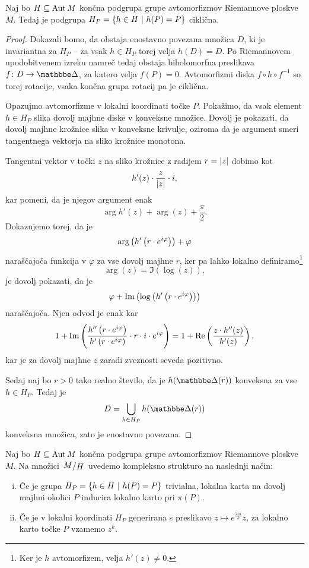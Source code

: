 \begin{trditev}
Naj bo $H \subseteq \operatorname{Aut} M$ končna podgrupa grupe avtomorfizmov
Riemannove ploskve $M$. Tedaj je podgrupa
$H_P = \left\{h \in H~\middle\vert~h(P) = P\right\}$ ciklična.
\end{trditev}

\begin{proof}
Dokazali bomo, da obstaja enostavno povezana množica $D$, ki je
invariantna za $H_P$ -- za vsak $h \in H_P$ torej velja $h(D) = D$.
Po Riemannovem upodobitvenem izreku namreč tedaj obstaja
biholomorfna preslikava $f \colon D \to \dsk$, za katero velja
$f(P) = 0$. Avtomorfizmi diska $f \circ h \circ f^{-1}$ so torej
rotacije, vsaka končna grupa rotacij pa je ciklična.

Opazujmo avtomorfizme v lokalni koordinati točke $P$. Pokažimo, da
vsak element $h \in H_P$ slika dovolj majhne diske v konveksne
množice. Dovolj je pokazati, da dovolj majhne krožnice slika v
konveksne krivulje, oziroma da je argument smeri tangentnega
vektorja na sliko krožnice monotona.

Tangentni vektor v točki $z$ na sliko krožnice z radijem
$r = \left\lvert z\right\rvert$ dobimo kot
\[
h'(z) \cdot \frac{z}{\left\lvert z\right\rvert} \cdot i,
\]
kar pomeni, da je njegov argument enak
\[
\arg{h'(z)} + \arg(z) + \frac{\pi}{2}.
\]
Dokazujemo torej, da je
\[
\arg \left(h' \left(r \cdot e^{i \varphi}\right)\right) + \varphi
\]
naraščajoča funkcija v $\varphi$ za vse dovolj majhne $r$, ker pa
lahko lokalno definiramo\footnote{Ker je $h$ avtomorfizem, velja
$h'(z) \ne 0$.}
\[
\arg(z) = \Im(\log(z)),
\]
je dovolj pokazati, da je
\[
\varphi + \operatorname{Im} \left(\log \left(h' \left(r \cdot e^{i \varphi}\right)\right)\right)
\]
naraščajoča. Njen odvod je enak kar
\[
1 + \operatorname{Im} \left(\frac{h'' \left(r \cdot e^{i \varphi}\right)}
{h' \left(r \cdot e^{i \varphi}\right)} \cdot
r \cdot i \cdot e^{i \varphi}\right) =
1 + \operatorname{Re} \left(\frac{z \cdot h''(z)}{h'(z)}\right),
\]
kar je za dovolj majhne $z$ zaradi zveznosti seveda pozitivno.

Sedaj naj bo $r > 0$ tako realno število, da je
$h(\dsk(r))$ konveksna za vse $h \in H_P$. Tedaj je
\[
D = \bigcup_{h \in H_P} h(\dsk(r))
\]
konveksna množica, zato je enostavno povezana.
\end{proof}

\begin{definicija}
Naj bo $H \subseteq \operatorname{Aut} M$ končna podgrupa grupe avtomorfizmov
Riemannove ploskve $M$. Na množici $\kvoc{M}{H}$ uvedemo kompleksno
strukturo na naslednji način:

\begin{enumerate}[i)]
\item Če je grupa $H_P = \left\{h \in H~\middle\vert~h(P) = P\right\}$ trivialna,
lokalna karta na dovolj majhni okolici $P$ inducira lokalno karto
pri $\pi(P)$.
\item Če je v lokalni koordinati $H_P$ generirana s preslikavo
$z \mapsto e^{\frac{2 \pi i}{k}} z$, za lokalno karto točke $P$
vzamemo $z^k$.
\end{enumerate}
\end{definicija}

